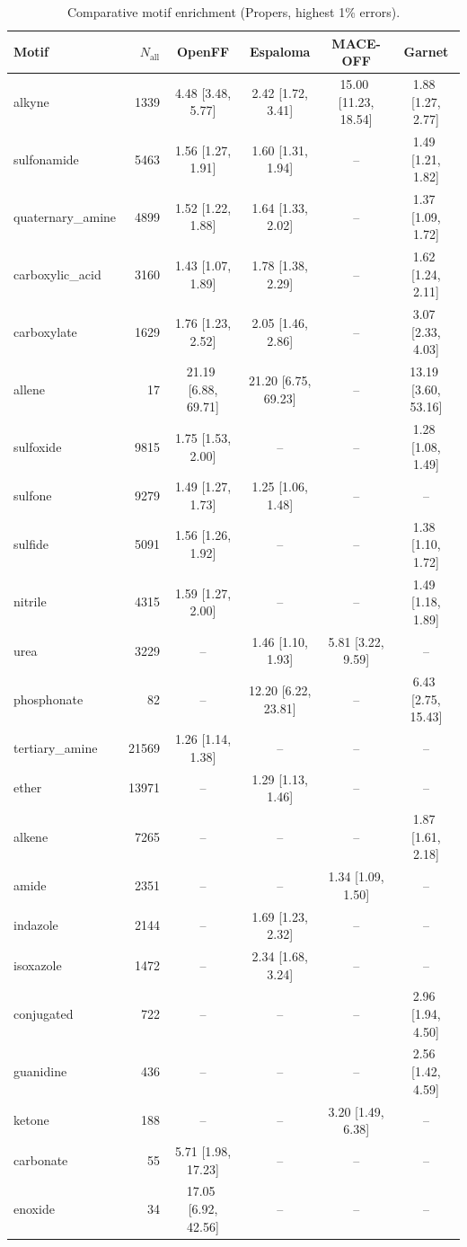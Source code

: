 \begin{table}[h!]
  \centering
  \small
  \setlength{\tabcolsep}{5pt}
  \renewcommand{\arraystretch}{1.15}
  \begin{tabular}{l r c c c c}
    \hline
    Motif & $N_\mathrm{all}$ & OpenFF & Espaloma & MACE-OFF & Garnet \\
    \hline
    alkyne & 1339 & 4.48\,\,[3.48, 5.77] & 2.42\,\,[1.72, 3.41] & 15.00\,\,[11.23, 18.54] & 1.88\,\,[1.27, 2.77] \\
    \hdashline
    sulfonamide & 5463 & 1.56\,\,[1.27, 1.91] & 1.60\,\,[1.31, 1.94] & -- & 1.49\,\,[1.21, 1.82] \\
    quaternary\_amine & 4899 & 1.52\,\,[1.22, 1.88] & 1.64\,\,[1.33, 2.02] & -- & 1.37\,\,[1.09, 1.72] \\
    carboxylic\_acid & 3160 & 1.43\,\,[1.07, 1.89] & 1.78\,\,[1.38, 2.29] & -- & 1.62\,\,[1.24, 2.11] \\
    carboxylate & 1629 & 1.76\,\,[1.23, 2.52] & 2.05\,\,[1.46, 2.86] & -- & 3.07\,\,[2.33, 4.03] \\
    allene & 17 & 21.19\,\,[6.88, 69.71] & 21.20\,\,[6.75, 69.23] & -- & 13.19\,\,[3.60, 53.16] \\
    \hdashline
    sulfoxide & 9815 & 1.75\,\,[1.53, 2.00] & -- & -- & 1.28\,\,[1.08, 1.49] \\
    sulfone & 9279 & 1.49\,\,[1.27, 1.73] & 1.25\,\,[1.06, 1.48] & -- & -- \\
    sulfide & 5091 & 1.56\,\,[1.26, 1.92] & -- & -- & 1.38\,\,[1.10, 1.72] \\
    nitrile & 4315 & 1.59\,\,[1.27, 2.00] & -- & -- & 1.49\,\,[1.18, 1.89] \\
    urea & 3229 & -- & 1.46\,\,[1.10, 1.93] & 5.81\,\,[3.22, 9.59] & -- \\
    phosphonate & 82 & -- & 12.20\,\,[6.22, 23.81] & -- & 6.43\,\,[2.75, 15.43] \\
    \hdashline
    tertiary\_amine & 21569 & 1.26\,\,[1.14, 1.38] & -- & -- & -- \\
    ether & 13971 & -- & 1.29\,\,[1.13, 1.46] & -- & -- \\
    alkene & 7265 & -- & -- & -- & 1.87\,\,[1.61, 2.18] \\
    amide & 2351 & -- & -- & 1.34\,\,[1.09, 1.50] & -- \\
    indazole & 2144 & -- & 1.69\,\,[1.23, 2.32] & -- & -- \\
    isoxazole & 1472 & -- & 2.34\,\,[1.68, 3.24] & -- & -- \\
    conjugated & 722 & -- & -- & -- & 2.96\,\,[1.94, 4.50] \\
    guanidine & 436 & -- & -- & -- & 2.56\,\,[1.42, 4.59] \\
    ketone & 188 & -- & -- & 3.20\,\,[1.49, 6.38] & -- \\
    carbonate & 55 & 5.71\,\,[1.98, 17.23] & -- & -- & -- \\
    enoxide & 34 & 17.05\,\,[6.92, 42.56] & -- & -- & -- \\
    \hline
  \end{tabular}
  \caption{Comparative motif enrichment (Propers, highest 1\% errors).}
  \label{tab:compare_propers_worst}
\end{table}